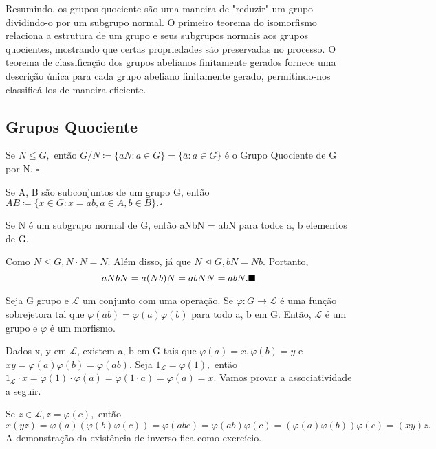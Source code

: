 \documentclass[algebra_notes.tex]{subfiles}
\begin{document}
Resumindo, os grupos quociente s\~{a}o uma maneira de "reduzir" um grupo dividindo-o por um subgrupo normal. O primeiro teorema
do isomorfismo relaciona a estrutura de um grupo e seus subgrupos normais aos grupos quocientes, mostrando que certas
propriedades s\~{a}o preservadas no processo. O teorema de classifica\c{c}\~{a}o dos grupos abelianos finitamente gerados
fornece uma descri\c{c}\~{a}o \'{u}nica para cada grupo abeliano finitamente gerado, permitindo-nos classific\'{a}-los de
maneira eficiente.

\subsection{Grupos Quociente}
\begin{def*}
	Se $N\leq{G},$ então $G/N\coloneqq\{aN: a\in G\}=\{\overline{a}: a\in G\}$ é o Grupo Quociente de G por N. $\square$
\end{def*}
\begin{def*}
	Se A, B são subconjuntos de um grupo G, então $AB\coloneqq\{x\in G: x=ab, a\in A, b\in B\}.\square$
\end{def*}
\begin{lemma*}
	Se N é um subgrupo normal de G, então aNbN = abN para todos a, b elementos de G.
\end{lemma*}
\begin{proof*}
	Como $N\leq{G}, N \cdot N = N.$ Além disso, já que $N\trianglelefteq{G}, bN = Nb.$ Portanto,
	$$
		aNbN = a(Nb)N = abNN = abN. \text{$\blacksquare$}
	$$
\end{proof*}
\begin{lemma*}
	Seja G grupo e $\mathcal{L}$ um conjunto com uma operação. Se $\varphi:G\rightarrow \mathcal{L}$ é uma função
	sobrejetora tal que $\varphi(ab)=\varphi(a)\varphi(b)$ para todo a, b em G. Então, $\mathcal{L}$ é um grupo e $\varphi$ é
	um morfismo.
\end{lemma*}
\begin{proof*}
	Dados x, y em $\mathcal{L}$, existem a, b em G tais que $\varphi(a)=x, \varphi(b)=y$ e $xy = \varphi(a)\varphi(b)=\varphi(ab).$
	Seja $1_{\mathcal{L}}=\varphi(1),$ então $1_{\mathcal{L}}\cdot x=\varphi(1)\cdot \varphi(a) = \varphi(1 \cdot a) = \varphi(a)=x.$
	Vamos provar a associatividade a seguir.

	Se $z\in \mathcal{L}, z=\varphi(c),$ então
	$$
		x(yz)=\varphi(a)(\varphi(b)\varphi(c)) = \varphi(abc)=\varphi(ab)\varphi(c)=(\varphi(a)\varphi(b))\varphi(c) = (xy)z.
	$$
	A demonstração da existência de inverso fica como exercício. \qedsymbol
\end{proof*}
\end{document}

